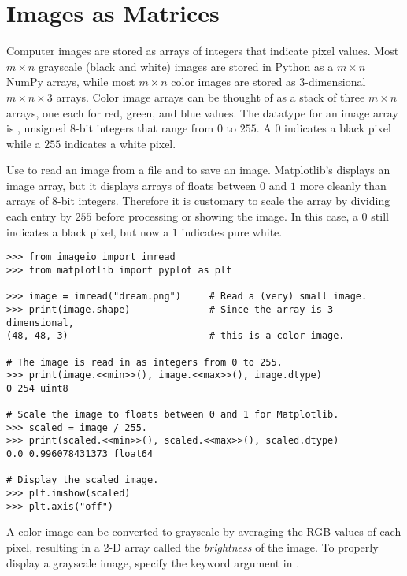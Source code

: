 \section*{Images as Matrices} %

Computer images are stored as arrays of integers that indicate pixel values.
Most $m\times n$ grayscale (black and white) images are stored in Python as a $m\times n$ NumPy arrays, while most $m\times n$ color images are stored as $3$-dimensional $m\times n \times 3$ arrays.
Color image arrays can be thought of as a stack of three $m\times n$ arrays, one each for red, green, and blue values.
The datatype for an image array is , unsigned 8-bit integers that range from $0$ to $255$.
A $0$ indicates a black pixel while a $255$ indicates a white pixel.

Use  to read an image from a file and  to save an image.
Matplotlib's  displays an image array, but it displays arrays of floats between $0$ and $1$ more cleanly than arrays of 8-bit integers.
Therefore it is customary to scale the array by dividing each entry by $255$ before processing or showing the image.
In this case, a $0$ still indicates a black pixel, but now a $1$ indicates pure white.

\begin{lstlisting}
>>> from imageio import imread
>>> from matplotlib import pyplot as plt

>>> image = imread("dream.png")     # Read a (very) small image.
>>> print(image.shape)              # Since the array is 3-dimensional,
(48, 48, 3)                         # this is a color image.

# The image is read in as integers from 0 to 255.
>>> print(image.<<min>>(), image.<<max>>(), image.dtype)
0 254 uint8

# Scale the image to floats between 0 and 1 for Matplotlib.
>>> scaled = image / 255.
>>> print(scaled.<<min>>(), scaled.<<max>>(), scaled.dtype)
0.0 0.996078431373 float64

# Display the scaled image.
>>> plt.imshow(scaled)
>>> plt.axis("off")
\end{lstlisting}

A color image can be converted to grayscale by averaging the RGB values of each pixel, resulting in a 2-D array called the \emph{brightness} of the image.
To properly display a grayscale image, specify the keyword argument  in .


